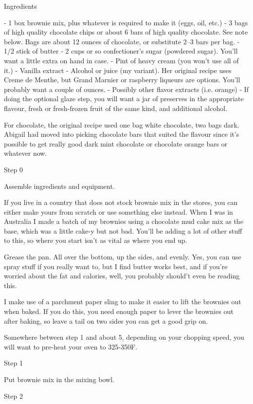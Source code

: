 Ingredients

- 1 box brownie mix, plus whatever is required to make it (eggs, oil, etc.)
- 3 bags of high quality chocolate chips or about 6 bars of high quality chocolate. See note below. Bags are about 12 ounces of chocolate, or substitute 2--3 bars per bag.
- 1/2 stick of butter
- 2 cups or so confectioner's sugar (powdered sugar). You'll want a little extra on hand in case.
- Pint of heavy cream (you won't use all of it.)
- Vanilla extract
- Alcohol or juice (my variant). Her original recipe uses Creme de Menthe, but Grand Marnier or raspberry liqueurs are options. You'll probably want a couple of ounces.
- Possibly other flavor extracts (i.e. orange)
- If doing the optional glaze step, you will want a jar of preserves in the appropriate flavour, fresh or fresh-frozen fruit of the same kind, and additional alcohol.

For chocolate, the original recipe used one bag white chocolate, two bags dark. Abigail had moved into picking chocolate bars that suited the flavour since it's possible to get really good dark mint chocolate or chocolate orange bars or whatever now.

Step 0

Assemble ingredients and equipment.

If you live in a country that does not stock brownie mix in the stores, you can either make yours from scratch or use something else instead. When I was in Australia I made a batch of my brownies using a chocolate mud cake mix as the base, which was a little cake-y but not bad. You'll be adding a lot of other stuff to this, so where you start isn't as vital as where you end up.

Grease the pan. All over the bottom, up the sides, and evenly. Yes, you can use spray stuff if you really want to, but I find butter works best, and if you're worried about the fat and calories, well, you probably should't even be reading this.

I make use of a parchment paper sling to make it easier to lift the brownies out when baked. If you do this, you need enough paper to lever the brownies out after baking, so leave a tail on two sides you can get a good grip on.

Somewhere between step 1 and about 5, depending on your chopping speed, you will want to pre-heat your oven to 325-350F.

Step 1

Put brownie mix in the mixing bowl.

Step 2

